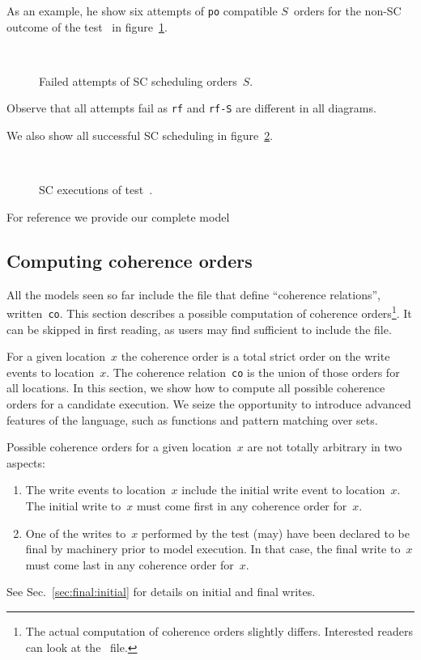 As an example, he show six attempts of \texttt{po} compatible $S$~orders
for the non-SC outcome of the test~ in figure~\ref{sblamport}.
\begin{figure}[htp]
\caption{\label{sblamport}Failed attempts of SC scheduling orders~$S$.}
\begin{center}
\quad{}\quad{}\\
\quad{}\quad{}
\end{center}
\end{figure}
Observe that all attempts fail as \texttt{rf} and \texttt{rf-S}
are different in all diagrams.

We also show all successful SC scheduling in figure~\ref{sbok}.
\begin{figure}[htp]
\caption{\label{sbok}SC executions of test~.}
\begin{center}
\quad{}\quad{}\\
\quad{}\quad{}
\end{center}
\end{figure}


For reference we provide our complete model~


\subsection{Computing \label{sec:cos}coherence orders}
All the models seen so far include the
file  that define
``coherence relations'', written~\texttt{co}. This section describes
a possible computation of coherence orders\footnote{The actual computation of coherence orders slightly differs. Interested readers can look at the
~file.}. It can be skipped in first
reading, as users may find sufficient to include the file.

For a given location~$x$ the coherence order is a total strict order on the
write events to location~$x$. The coherence relation~\texttt{co} is the union
of those orders for all locations.
In this section, we show how to compute all possible coherence orders for
a candidate execution.
We seize the opportunity to introduce advanced features of the \cat{}
language, such as functions and pattern matching over sets.

Possible coherence orders for a given location~$x$
are not totally arbitrary in two aspects:
\begin{enumerate}
\item The write events to location~$x$ include
the initial write event to location~$x$.  The initial write to~$x$ must come
first in any coherence order for~$x$.
\item One of the writes to~$x$ performed by the test (may) have been declared
to be final by \herd{} machinery prior to model execution.
In that case, the final write to~$x$ must come last in any coherence order
for~$x$.
\end{enumerate}
See Sec.~\ref{sec:final:initial} for details on initial and final writes.

